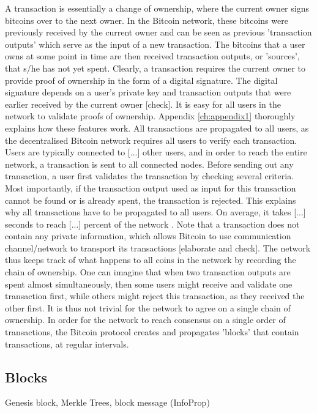 A transaction is essentially a change of ownership, where the current owner signs bitcoins over to the next owner. In the Bitcoin network, these bitcoins were previously received by the current owner and can be seen as previous 'transaction outputs' which serve as the input of a new transaction. The bitcoins that a user owns at some point in time are then received transaction outputs, or 'sources', that s/he has not yet spent. Clearly, a transaction requires the current owner to provide proof of ownership in the form of a digital signature. The digital signature depends on a user's private key and transaction outputs that were earlier received by the current owner [check]. It is easy for all users in the network to validate proofs of ownership. Appendix \ref{ch:appendix1} thoroughly explains how these features work. All transactions are propagated to all users, as the decentralised Bitcoin network requires all users to verify each transaction. Users are typically connected to [...] other users, and in order to reach the entire network, a transaction is sent to all connected nodes. Before sending out any transaction, a user first validates the transaction by checking several criteria. Most importantly, if the transaction output used as input for this transaction cannot be found or is already spent, the transaction is rejected. This explains why all transactions have to be propagated to all users. On average, it takes [...] seconds to reach [...] percent of the network \cite{Decker2013InfoProp}. Note that a transaction does not contain any private information, which allows Bitcoin to use communication channel/network to transport its transactions [elaborate and check]. The network thus keeps track of what happens to all coins in the network by recording the chain of ownership. One can imagine that when two transaction outputs are spent almost simultaneously, then some users might receive and validate one transaction first, while others might reject this transaction, as they received the other first. It is thus not trivial for the network to agree on a single chain of ownership. In order for the network to reach consensus on a single order of transactions, the Bitcoin protocol creates and propagates 'blocks' that contain transactions, at regular intervals.

\subsection{Blocks}

Genesis block, Merkle Trees, block message (InfoProp)

